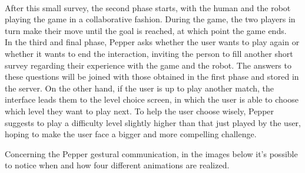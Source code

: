 \documentclass{article}
\begin{document}
\\
\noindent After this small survey, the second phase starts, with the human and the robot playing the game in a collaborative fashion. During the game, the two players in turn make their move until the goal is reached, at which point the game ends.\\
\noindent In the third and final phase, Pepper asks whether the user wants to play again or whether it wants to end the interaction, inviting the person to fill another short survey regarding their experience with the game and the robot. The answers to these questions will be joined with those obtained in the first phase and stored in the server. On the other hand, if the user is up to play another match, the interface leads them to the level choice screen, in which the user is able to choose which level they want to play next. To help the user choose wisely, Pepper suggests to play a difficulty level slightly higher than that just played by the user, hoping to make the user face a bigger and more compelling challenge.




Concerning the Pepper gestural communication, in the images below it's possible to notice when and how four different animations are realized. 
\end{document}
